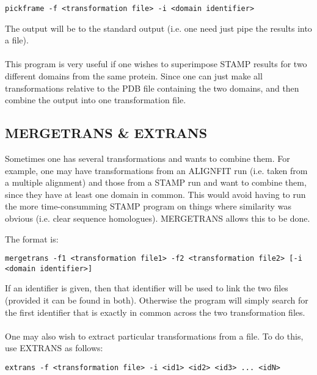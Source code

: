 \begin{scriptsize}\begin{verbatim}
pickframe -f <transformation file> -i <domain identifier>
\end{verbatim} \end{scriptsize}

The output will be to the standard output (i.e. one need just
pipe the results into a file).  \\
\\
This program is very useful if one wishes to superimpose STAMP results
for two different domains from the same protein.  Since one can just
make all transformations relative to the PDB file containing the two domains,
and then combine the output into one transformation file.


\subsection{MERGETRANS \& EXTRANS}

Sometimes one has several transformations and wants to combine them.  For example,
one may have transformations from an ALIGNFIT run (i.e. taken from a multiple alignment) and
those from a STAMP run and want to combine them, since they have at least one domain 
in common.  This would avoid having to run the more time-consumming STAMP program on
things where similarity was obvious (i.e. clear sequence homologues).  MERGETRANS allows this to
be done.

The format is:\\

\begin{scriptsize}\begin{verbatim}
mergetrans -f1 <transformation file1> -f2 <transformation file2> [-i <domain identifier>]
\end{verbatim} \end{scriptsize}


If an identifier is given, then that identifier will be used to link the two files (provided it
can be found in both).   Otherwise the program will simply search for the first identifier that 
is exactly in common across the two transformation files.\\
\\
One may also wish to extract particular transformations from a file.  To do this, use EXTRANS as follows:\\

\begin{scriptsize}\begin{verbatim}
extrans -f <transformation file> -i <id1> <id2> <id3> ... <idN>
\end{verbatim} \end{scriptsize}


